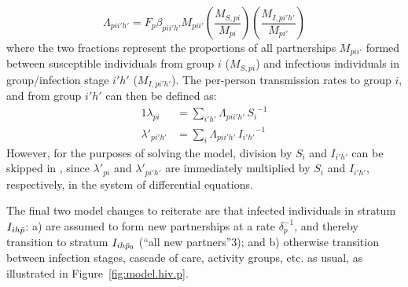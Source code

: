 \begin{equation}
  \Lambda_{pii'h'} = F_p \beta_{pii'h'} M_{pii'}
  \left(\frac{M_{S,pi}}{M_{pi}}\right)
  \left(\frac{M_{I,pi'h'}}{M_{pi'}}\right)
\end{equation}
where the two fractions represent the proportions of all partnerships $M_{pii'}$
formed between susceptible individuals from group $i$ ($M_{S,pi}$)
and infectious individuals in group/infection stage $i'h'$ ($M_{I,pi'h'}$).
The per-person transmission rates to group $i$, and from group $i'h'$ can then be defined as:
\begin{alignat}{1}
  \lambda_{pi} &= \sum_{i'h'} \Lambda_{pii'h'}\,{S_{i}}^{-1} \label{eq:foi.i} \\
  \lambda'_{pi'h'} &= \sum_{i} \Lambda_{pii'h'}\,{I_{i'h'}}^{-1} \label{eq:foi.jh}
\end{alignat}
However, for the purposes of solving the model,
division by $S_{i}$ and $I_{i'h'}$ can be skipped in ,
since $\lambda'_{pi}$ and $\lambda'_{pi'h'}$ are immediately multiplied by $S_{i}$ and $I_{i'h'}$,
respectively, in the system of differential equations.
\par
The final two model changes to reiterate are that infected individuals in stratum $I_{ih\bar{p}}$:
a) are assumed to form new partnerships at a rate $\delta_p^{-1}$,
and thereby transition to stratum $I_{ih\bar{p}_0}$ (``all new partners''3); and
b) otherwise transition between infection stages, cascade of care, activity groups, etc. as usual,
as illustrated in Figure~\ref{fig:model.hiv.p}.
